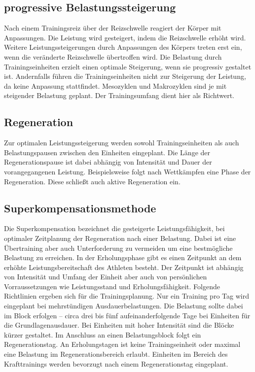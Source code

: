 \subsection{progressive Belastungssteigerung}
    Nach einem Trainingsreiz über der Reizschwelle reagiert der Körper mit Anpassungen. Die Leistung wird gesteigert, indem die Reizschwelle erhöht wird. Weitere Leistungssteigerungen durch Anpassungen des Körpers treten erst ein, wenn die veränderte Reizschwelle übertroffen wird. Die Belastung durch Trainingseinheiten erzielt einen optimale Steigerung, wenn sie progressiv gestaltet ist. Andernfalls führen die Trainingseinheiten nicht zur Steigerung der Leistung, da keine Anpassung stattfindet.\cite[58]{Seidenspinner2005} \newline 
    Mesozyklen und Makrozyklen sind je mit steigender Belastung geplant. Der Trainingsumfang dient hier als Richtwert. \cite[60-61]{Radsporttraining}
\subsection{Regeneration}
    Zur optimalen Leistungssteigerung werden sowohl Trainingseinheiten als auch Belastungspausen zwischen den Einheiten eingeplant. Die Länge der Regenerationspause ist dabei abhängig von Intensität und Dauer der vorangegangenen Leistung. Beispielsweise folgt nach Wettkämpfen eine Phase der Regeneration. Diese schließt auch aktive Regeneration ein. 
\subsection{Superkompensationsmethode}
    Die Superkompensation bezeichnet die gesteigerte Leistungsfähigkeit, bei optimaler Zeitplanung der Regeneration nach einer Belastung.\cite[163]{Trainingswissenschaft} Dabei ist eine Übertraining aber auch Unterforderung zu vermeiden um eine bestmögliche Belastung zu erreichen. In der Erholungsphase gibt es einen Zeitpunkt an dem erhöhte Leistungsbereitschaft des Athleten  besteht. Der Zeitpunkt ist abhängig von Intensität und Umfang der Einheit aber auch von persönlichen Vorraussetzungen wie Leistungsstand und Erholungsfähigkeit. \newline
    Folgende Richtlinien ergeben sich für die Trainingsplanung. \cite[44-46]{Radsporttraining} Nur ein Training pro Tag wird eingeplant bei mehrstündigen Ausdauerbelastungen. Die Belastung sollte dabei im Block erfolgen -- circa drei bis fünf aufeinanderfolgende Tage bei Einheiten für die Grundlagenausdauer. Bei Einheiten mit hoher Intensität sind die Blöcke kürzer gestaltet. Im Anschluss an einen Belastungsblock folgt ein Regenerationstag. An Erholungstagen ist keine Trainingseinheit oder maximal eine Belastung im Regenerationsbereich erlaubt. Einheiten im Bereich des Krafttrainings werden bevorzugt nach einem Regenerationstag eingeplant. 

